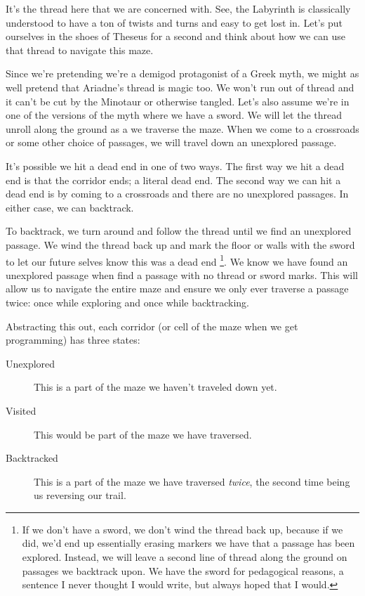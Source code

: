 It's the thread here that we are concerned with.  See, the Labyrinth is classically understood to have a ton of twists and turns and easy to get lost in.  Let's put ourselves in the shoes of Theseus for a second and think about how we can use that thread to navigate this maze.  

Since we're pretending we're a demigod protagonist of a Greek myth, we might as well pretend that Ariadne's thread is magic too.  We won't run out of thread and it can't be cut by the Minotaur or otherwise tangled.  Let's also assume we're in one of the versions of the myth where we have a sword. We will let the thread unroll along the ground as a we traverse the maze.  When we come to a crossroads or some other choice of passages, we will travel down an unexplored passage.  


It's possible we hit a dead end in one of two ways.  The first way we hit a dead end is that the corridor ends;  a literal dead end.  The second way we can hit a dead end is by coming to a crossroads and there are no unexplored passages.  In either case, we can backtrack.

To backtrack, we turn around and follow the thread until we find an unexplored passage.  We wind the thread back up and mark the floor or walls with the sword to let our future selves know this was a dead end \footnote{If we don't have a sword, we don't wind the thread back up, because if we did, we'd end up essentially erasing markers we have that a passage has been explored. Instead, we will leave a second line of thread along the ground on passages we backtrack upon.  We have the sword for pedagogical reasons, a sentence I never thought I would write, but always hoped that I would.}. We know we have found an unexplored passage when find a passage with no thread or sword marks. This will allow us to navigate the entire maze and ensure we only ever traverse a passage twice:  once while exploring and once while backtracking.


Abstracting this out, each corridor (or cell of the maze when we get programming) has three states:

\begin{description}
	\item[Unexplored] This is a part of the maze we haven't traveled down yet.
	\item[Visited] This would be part of the maze we have traversed.
	\item[Backtracked] This is a part of the maze we have traversed \textit{twice}, the second time being us reversing our trail.
\end{description}

